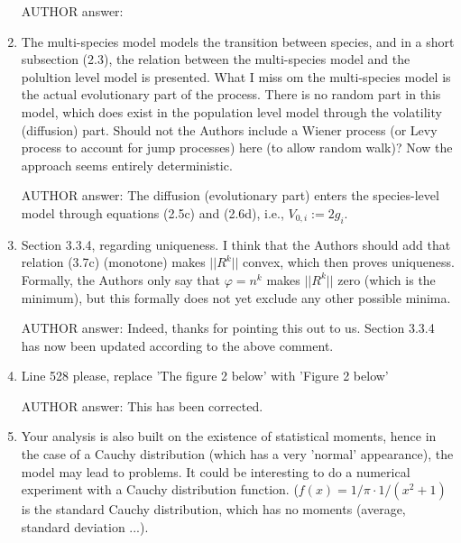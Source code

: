 \documentclass[a4paper,11pt]{scrartcl}
\let\phi\varphi
\begin{document}
\begin{enumerate}
AUTHOR answer:

\item
The multi-species model models the transition between species, and in a short subsection (2.3), the relation between the multi-species model and the polultion level model is presented. What I miss om the multi-species model is the actual evolutionary part of the process. There is no random part in this model, which does exist in the population level model through the volatility (diffusion) part. Should not the Authors include a Wiener process (or Levy process to account for jump processes) here (to allow random walk)? Now the approach seems entirely deterministic.

AUTHOR answer: The diffusion (evolutionary part) enters the species-level model through equations (2.5c) and (2.6d), i.e., $V_{0,i} := 2g_i$.

\item
Section 3.3.4, regarding uniqueness. I think that the Authors should add that relation (3.7c) (monotone) makes $||R^k||$ convex, which then proves uniqueness. Formally, the Authors only say that $\phi = n^k$ makes $||R^k||$ zero (which is the minimum), but this formally does not yet exclude any other possible minima.

AUTHOR answer: Indeed, thanks for pointing this out to us. Section 3.3.4 has now been updated according to the above comment.

\item
Line 528 please, replace 'The figure 2 below' with 'Figure 2 below'

AUTHOR answer: This has been corrected.

\item
Your analysis is also built on the existence of statistical moments, hence in the case of a Cauchy distribution (which has a very 'normal' appearance), the model may lead to problems. It could be interesting to do a numerical experiment with a Cauchy distribution function. ($f(x) = 1/\pi \cdot 1 / (x^2 + 1)$ is the standard Cauchy distribution, which has no moments (average, standard deviation ...).


\end{enumerate}
\end{document}
